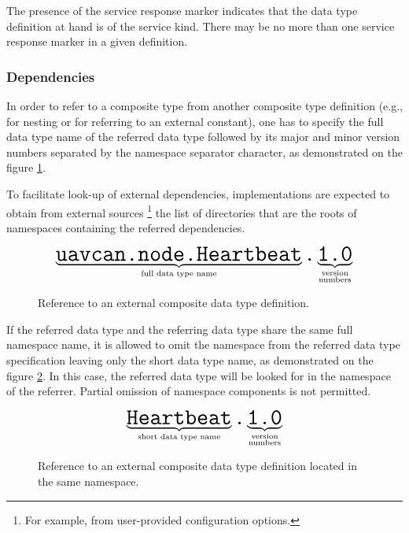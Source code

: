 The presence of the service response marker indicates that the data type definition at hand is of the service kind.
There may be no more than one service response marker in a given definition.

\subsubsection{Dependencies}

In order to refer to a composite type from another composite type definition
(e.g., for nesting or for referring to an external constant),
one has to specify the full data type name of the referred data type followed by its
major and minor version numbers separated by the namespace separator character,
as demonstrated on the figure \ref{fig:dsdl_nested_reference}.

To facilitate look-up of external dependencies,
implementations are expected to obtain from external sources%
\footnote{For example, from user-provided configuration options.}
the list of directories that are the roots of namespaces containing the referred dependencies.

\begin{figure}[H]
    $$
    \underbrace{\texttt{\huge{uavcan.node.Heartbeat}}}_{\text{full data type name}}%
    \texttt{\huge{.}}%
    \underbrace{\texttt{\huge{1.0}}}_{\substack{\text{version} \\ \text{numbers}}}%
    $$
    \caption{Reference to an external composite data type definition.\label{fig:dsdl_nested_reference}}
\end{figure}

If the referred data type and the referring data type share the same full namespace name,
it is allowed to omit the namespace from the referred data type specification
leaving only the short data type name, as demonstrated on the figure \ref{fig:dsdl_nested_reference_short}.
In this case, the referred data type will be looked for in the namespace of the referrer.
Partial omission of namespace components is not permitted.

\begin{figure}[H]
    $$
    \underbrace{\texttt{\huge{Heartbeat}}}_{\text{short data type name}}%
    \texttt{\huge{.}}%
    \underbrace{\texttt{\huge{1.0}}}_{\substack{\text{version} \\ \text{numbers}}}%
    $$
    \caption{Reference to an external composite data type definition located in the same namespace.
    \label{fig:dsdl_nested_reference_short}}
\end{figure}

